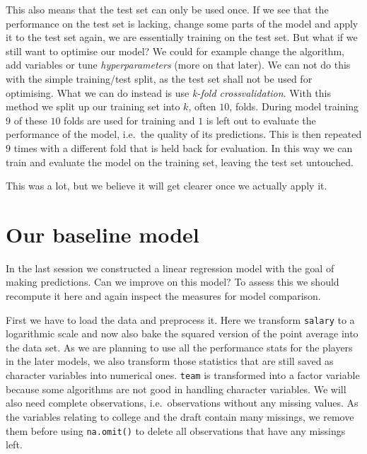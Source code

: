 \documentclass[
]{book}
\begin{document}
This also means that the test set can only be used once. If we see that the
performance on the test set is lacking, change some parts of the model and apply
it to the test set again, we are essentially training on the test set.
But what if we still want to optimise our model? We could for example change the
algorithm, add variables or tune \emph{hyperparameters} (more on that later). We can
not do this with the simple training/test split, as the test set shall not be
used for optimising. What we can do instead is use \emph{k-fold crossvalidation}.
With this method we split up our training set into \(k\), often \(10\), folds.
During model training \(9\) of these \(10\) folds are used for training and \(1\) is
left out to evaluate the performance of the model, i.e.~the quality of its
predictions. This is then repeated \(9\) times with a different fold that is held
back for evaluation. In this way we can train and evaluate the model on the
training set, leaving the test set untouched.

This was a lot, but we believe it will get clearer once we actually apply it.

\hypertarget{our-baseline-model}{%
\section{Our baseline model}\label{our-baseline-model}}

In the last session we constructed a linear regression model with the goal of
making predictions. Can we improve on this model? To assess this we should
recompute it here and again inspect the measures for model comparison.

First we have to load the data and preprocess it. Here we transform \texttt{salary} to
a logarithmic scale and now also bake the squared version of the point average
into the data set. As we are planning to use all the performance stats for the
players in the later models, we also transform those statistics that are still
saved as character variables into numerical ones. \texttt{team} is transformed into a
factor variable because some algorithms are not good in handling character
variables. We will also need complete observations, i.e.~observations without
any missing values. As the variables relating to college and the draft contain
many missings, we remove them before using \texttt{na.omit()} to delete all
observations that have any missings left.
\end{document}
